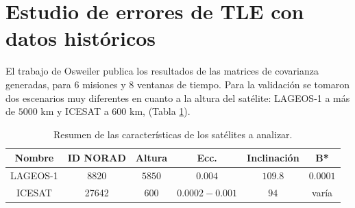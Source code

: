 \begin{table}[!h]
\caption{Resultados del Systems Tool Kit (STK) propagando el mismo TLE que ARxCODE.}
\centering
{}
\end{table}



\section{Estudio de errores de TLE con datos hist\'oricos}

El trabajo de Osweiler publica los resultados de las matrices de covarianza generadas, para 6 misiones y 8 ventanas de tiempo.
Para la validaci\'on se tomaron dos escenarios muy diferentes en cuanto a la altura del sat\'elite: LAGEOS-1 a m\'as de $5000$ km y ICESAT a $600 $ km, (Tabla \ref{tab:satescenarios}).

\begin{table}[!h]
\caption[Sat\'elites de Estudio]{Resumen de las caracter\'isticas de los sat\'elites a analizar.}

      \begin{tabular}{cccccc}
      \hline
      Nombre & ID NORAD & Altura & Ecc. & Inclinaci\'on & B* \\
      \hline
      LAGEOS-1 & 8820 & $5850$ & $0.004$ & $109.8$ & $0.0001$ \\
      ICESAT & 27642 & $600$ & $0.0002 - 0.001$ & $94$ & var\'ia \\
      \hline
      \end{tabular}
    \label{tab:satescenarios}
\end{table}

